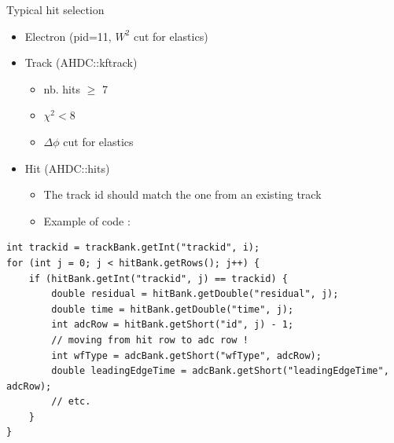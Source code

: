 \documentclass[10pt,aspectratio=43]{beamer}
\begin{document}
\begin{frame}[fragile]{Typical hit selection}
    \begin{itemize}
        \item Electron (pid=11, $W^2$ cut for elastics)
        \item Track (AHDC::kftrack)
            \begin{itemize}
                \item nb. hits $\geq$ 7
                \item $\chi^2 < 8$
                \item $\Delta \phi$ cut for elastics
            \end{itemize}
        \item Hit (AHDC::hits)
            \begin{itemize}
                \item The track id should match the one from an existing track
                \item Example of code :
            \end{itemize}
    \end{itemize}

\vspace{0.3cm}
\centering
\begin{minipage}{0.9\linewidth}
\begin{lstlisting}
int trackid = trackBank.getInt("trackid", i);
for (int j = 0; j < hitBank.getRows(); j++) {
    if (hitBank.getInt("trackid", j) == trackid) {
        double residual = hitBank.getDouble("residual", j);
        double time = hitBank.getDouble("time", j);
        int adcRow = hitBank.getShort("id", j) - 1;
        // moving from hit row to adc row !
        int wfType = adcBank.getShort("wfType", adcRow);
        double leadingEdgeTime = adcBank.getShort("leadingEdgeTime", adcRow);
        // etc.
    }
}
\end{lstlisting} 
\end{minipage}

\end{frame}
\end{document}
